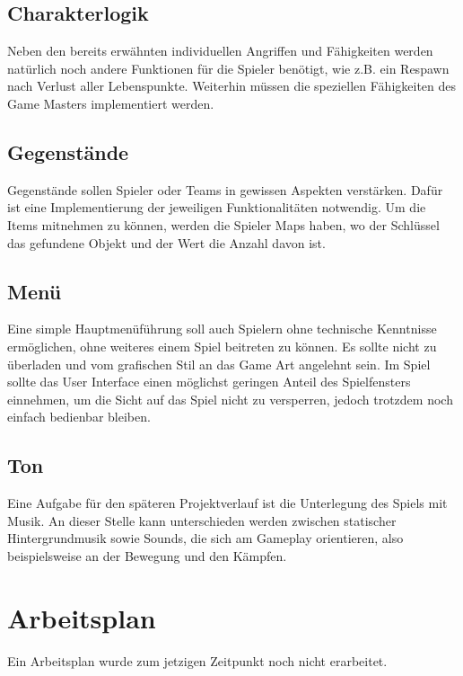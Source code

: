 \documentclass[10pt,a4paper,notitlepage]{report}
\begin{document}
\begin{flushleft}
\subsection{Charakterlogik} 
Neben den bereits erwähnten individuellen Angriffen und Fähigkeiten werden natürlich noch andere Funktionen für die Spieler benötigt, wie z.B. ein Respawn nach Verlust aller Lebenspunkte. Weiterhin müssen die speziellen Fähigkeiten des Game Masters implementiert werden.

\subsection{Gegenstände}
Gegenstände sollen Spieler oder Teams in gewissen Aspekten verstärken. Dafür ist eine Implementierung der jeweiligen Funktionalitäten notwendig. Um die Items mitnehmen zu können, werden die Spieler Maps haben, wo der Schlüssel das gefundene Objekt und der Wert die Anzahl davon ist.

\subsection{Menü}
Eine simple Hauptmenüführung soll auch Spielern ohne technische Kenntnisse ermöglichen, ohne weiteres einem Spiel beitreten zu können. Es sollte nicht zu überladen und vom grafischen Stil an das Game Art angelehnt sein. Im Spiel sollte das User Interface einen möglichst geringen Anteil des Spielfensters einnehmen, um die Sicht auf das Spiel nicht zu versperren, jedoch trotzdem noch einfach bedienbar bleiben. 

\subsection{Ton} 
Eine Aufgabe für den späteren Projektverlauf ist die Unterlegung des Spiels mit Musik. An dieser Stelle kann unterschieden werden zwischen statischer Hintergrundmusik sowie Sounds, die sich am Gameplay orientieren, also beispielsweise an der Bewegung und den Kämpfen.

\section{Arbeitsplan}
Ein Arbeitsplan wurde zum jetzigen Zeitpunkt noch nicht erarbeitet.


\end{flushleft}
\end{document}
